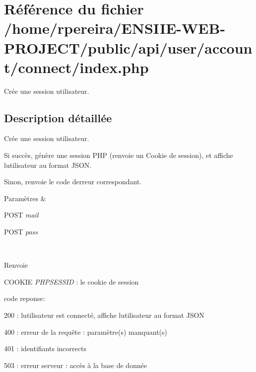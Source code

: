 \hypertarget{account_2connect_2index_8php}{}\section{Référence du fichier /home/rpereira/\+E\+N\+S\+I\+I\+E-\/\+W\+E\+B-\/\+P\+R\+O\+J\+E\+C\+T/public/api/user/account/connect/index.php}
\label{account_2connect_2index_8php}


Crée une session utilisateur.  




\subsection{Description détaillée}
Crée une session utilisateur. 

Si succès, génère une session P\+HP (renvoie un Cookie de session), et affiche l\textquotesingle{}utilisateur au format J\+S\+ON.

Sinon, renvoie le code d\textquotesingle{}erreur correspondant. 
\begin{DoxyParams}{Paramètres}
{\em } & 
\begin{DoxyItemize}
\item P\+O\+ST {\itshape mail} 
\item P\+O\+ST {\itshape pass} 
\end{DoxyItemize}\\
\hline
\end{DoxyParams}
\begin{DoxyReturn}{Renvoie}

\begin{DoxyItemize}
\item C\+O\+O\+K\+IE {\itshape P\+H\+P\+S\+E\+S\+S\+ID} \+: le cookie de session
\item code reponse\+:
\begin{DoxyItemize}
\item 200 \+: l\textquotesingle{}utilisateur est connecté, affiche l\textquotesingle{}utilisateur au format J\+S\+ON
\item 400 \+: erreur de la requête \+: paramètre(s) manquant(s)
\item 401 \+: identifiants incorrects
\item 503 \+: erreur serveur \+: accès à la base de donnée 
\end{DoxyItemize}
\end{DoxyItemize}
\end{DoxyReturn}
